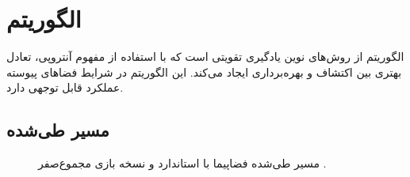 \section{الگوریتم }
\label{sec:sac_results}

الگوریتم   از روش‌های نوین یادگیری تقویتی است که با استفاده از مفهوم آنتروپی، تعادل بهتری بین اکتشاف و بهره‌برداری ایجاد می‌کند. این الگوریتم در شرایط فضاهای پیوسته عملکرد قابل توجهی دارد.
\subsection{مسیر طی‌شده}
\begin{figure}[H]
	\centering
	
	
	\caption{مسیر طی‌شده فضاپیما با  استاندارد و نسخه بازی مجموع‌صفر .}
\end{figure}

